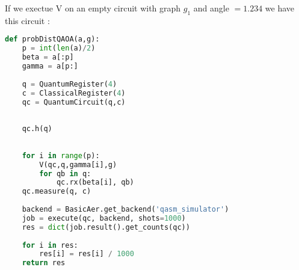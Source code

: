 \documentclass{article}
\theoremstyle{plain}
\begin{document}
    If we exectue V on an empty circuit with graph $g_1$ and angle $ = 1.234$ we
    have this circuit :

    \begin{center}
      \end{center}

    \newpage
  \begin{lstlisting}[language=python, label=code:QAOA,
                     caption=code that creates and simulates the QAOA circuit]
def probDistQAOA(a,g):
    p = int(len(a)/2)
    beta = a[:p]
    gamma = a[p:]
    
    q = QuantumRegister(4)
    c = ClassicalRegister(4)
    qc = QuantumCircuit(q,c)
    
    
    qc.h(q)
    
    
    for i in range(p):
        V(qc,q,gamma[i],g)
        for qb in q:
            qc.rx(beta[i], qb)    
    qc.measure(q, c)
    
    backend = BasicAer.get_backend('qasm_simulator')
    job = execute(qc, backend, shots=1000)
    res = dict(job.result().get_counts(qc))
    
    for i in res:
        res[i] = res[i] / 1000
    return res\end{lstlisting}
\end{document}

